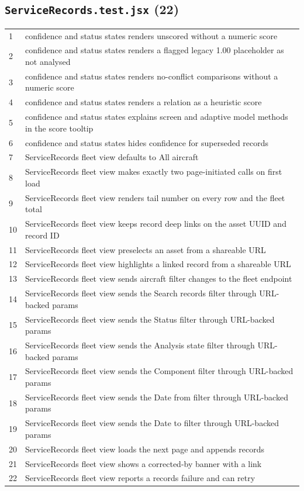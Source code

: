 \subsection*{\texttt{ServiceRecords.test.jsx} (22)}
\begin{longtable}{p{}p{}}
1 & confidence and status states renders unscored without a numeric score \\
2 & confidence and status states renders a flagged legacy 1.00 placeholder as not analysed \\
3 & confidence and status states renders no-conflict comparisons without a numeric score \\
4 & confidence and status states renders a relation as a heuristic score \\
5 & confidence and status states explains screen and adaptive model methods in the score tooltip \\
6 & confidence and status states hides confidence for superseded records \\
7 & ServiceRecords fleet view defaults to All aircraft \\
8 & ServiceRecords fleet view makes exactly two page-initiated calls on first load \\
9 & ServiceRecords fleet view renders tail number on every row and the fleet total \\
10 & ServiceRecords fleet view keeps record deep links on the asset UUID and record ID \\
11 & ServiceRecords fleet view preselects an asset from a shareable URL \\
12 & ServiceRecords fleet view highlights a linked record from a shareable URL \\
13 & ServiceRecords fleet view sends aircraft filter changes to the fleet endpoint \\
14 & ServiceRecords fleet view sends the Search records filter through URL-backed params \\
15 & ServiceRecords fleet view sends the Status filter through URL-backed params \\
16 & ServiceRecords fleet view sends the Analysis state filter through URL-backed params \\
17 & ServiceRecords fleet view sends the Component filter through URL-backed params \\
18 & ServiceRecords fleet view sends the Date from filter through URL-backed params \\
19 & ServiceRecords fleet view sends the Date to filter through URL-backed params \\
20 & ServiceRecords fleet view loads the next page and appends records \\
21 & ServiceRecords fleet view shows a corrected-by banner with a link \\
22 & ServiceRecords fleet view reports a records failure and can retry \\
\end{longtable}
